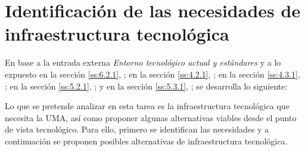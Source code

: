 \documentclass[11pt,a4paper,spanish,twoside]{book}
\begin{document}
\section{Identificación de las necesidades de infraestructura 
  tecnológica}
En base a la entrada externa \emph{Entorno tecnológico actual y estándares} y
a lo expuesto 
en la sección \vref{ss:6.2.1}, \emph{}; 
en la sección \vref{ss:4.2.1}, \emph{}; 
en la sección \vref{ss:4.3.1}, \emph{};
en la sección \vref{ss:5.2.1}, \emph{}; y
en la sección \vref{ss:5.3.1}, \emph{}; 
se desarrolla lo siguiente:

Lo que se pretende analizar en esta tarea es la infraestructura tecnológica
que necesita la UMA, así como proponer algunas alternativas viables desde
el punto de vista tecnológico. Para ello, primero se identifican las
necesidades y a continuación se proponen posibles alternativas de
infraestructura tecnológica. 
\end{document}
